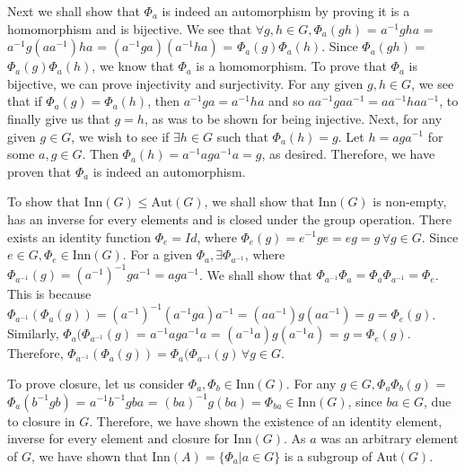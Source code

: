 \documentclass[12pt,letterpaper,reqno]{amsart}
\begin{document}
\begin{enumerate}
\begin{flushleft}
Next we shall show that $\Phi_a$ is indeed an automorphism by proving it is a homomorphism and is bijective. We see that $\forall g, h \in G, \Phi_a(gh)$ = $a^{-1}gha$ = $a^{-1}g(aa^{-1})ha$ = $(a^{-1}ga)(a^{-1}ha)$ = $\Phi_a(g)\Phi_a(h)$. Since $\Phi_a(gh)$ = $\Phi_a(g)\Phi_a(h)$, we know that $\Phi_a$ is a homomorphism. To prove that $\Phi_a$ is bijective, we can prove injectivity and surjectivity. For any given $g, h \in G$, we see that if $\Phi_a(g) = \Phi_a(h)$, then $a^{-1}ga = a^{-1}ha$ and so $aa^{-1}gaa^{-1} = aa^{-1}haa^{-1}$, to finally give us that $g = h$, as was to be shown for being injective. Next, for any given $g \in G$, we wish to see if $\exists h \in G$ such that $\Phi_a(h) = g$. Let $h = aga^{-1}$ for some $a, g \in G$. Then $\Phi_a(h) = a^{-1}aga^{-1}a = g$, as desired. Therefore, we have proven that $\Phi_a$ is indeed an automorphism.
\newline

To show that Inn$(G) \leq \text{Aut}(G)$, we shall show that Inn$(G)$ is non-empty, has an inverse for every elements and is closed under the group operation. There exists an identity function $\Phi_e = Id$, where $\Phi_e(g) = e^{-1}ge = eg = g\, \forall g \in G$. Since $e \in G, \Phi_e \in \text{Inn}(G)$. For a given $\Phi_a, \exists \Phi_{a^{-1}}$, where $\Phi_{a^{-1}}(g) = (a^{-1})^{-1}ga^{-1} = aga^{-1}$. We shall show that $\Phi_{a^{-1}}\Phi_a = \Phi_a\Phi_{a^{-1}} = \Phi_e$. This is because $\Phi_{a^{-1}}(\Phi_a(g)) = (a^{-1})^{-1}(a^{-1}ga)a^{-1} = (aa^{-1})g(aa^{-1}) = g = \Phi_e(g)$. Similarly,  $\Phi_a(\Phi_{a^{-1}}(g)$ = $a^{-1}aga^{-1}a$ = $(a^{-1}a)g(a^{-1}a)$ = $g = \Phi_e(g)$. Therefore, $\Phi_{a^{-1}}(\Phi_a(g)) = \Phi_a(\Phi_{a^{-1}}(g)\, \forall g \in G$.
\newline

To prove closure, let us consider $\Phi_a, \Phi_b \in \text{Inn}(G)$. For any $g \in G, \Phi_a\Phi_b(g)$ = $\Phi_a(b^{-1}gb)$ = $a^{-1}b^{-1}gba$ = $(ba)^{-1}g(ba) = \Phi_{ba} \in \text{Inn}(G)$, since $ba \in G$, due to closure in $G$. Therefore, we have shown the existence of an identity element, inverse for every element and closure for Inn$(G)$. As $a$ was an arbitrary element of $G$, we have shown that Inn$(A) = \{ \Phi_a | a \in G\}$ is a subgroup of Aut$(G)$.
\newline


\end{flushleft}
\end{enumerate}
\end{document}
